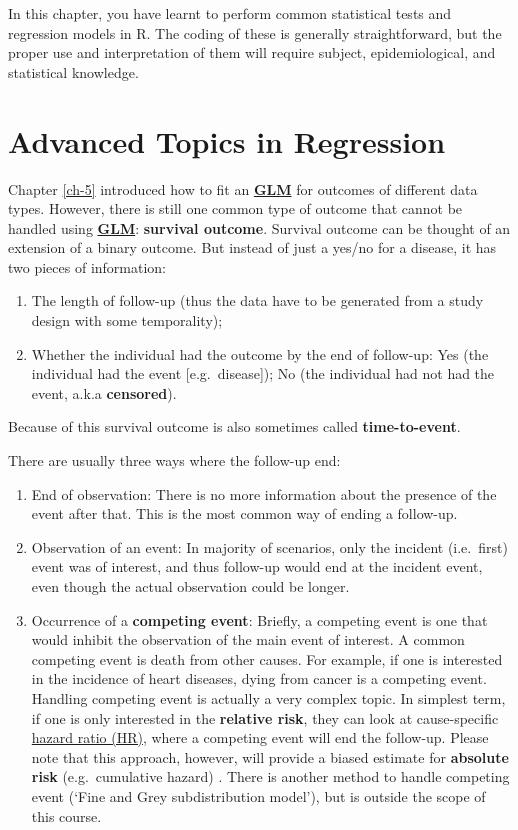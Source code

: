 \documentclass[
]{book}
\providecommand{\tightlist}{%
  \setlength{\itemsep}{0pt}\setlength{\parskip}{0pt}}
\begin{document}
In this chapter, you have learnt to perform common statistical tests and regression models in R. The coding of these is generally straightforward, but the proper use and interpretation of them will require subject, epidemiological, and statistical knowledge.

\chapter{Advanced Topics in Regression}\label{ch-6}

Chapter \ref{ch-5} introduced how to fit an \textbf{\hyperref[acronyms_GLM]{GLM}} for outcomes of different data types. However, there is still one common type of outcome that cannot be handled using \textbf{\hyperref[acronyms_GLM]{GLM}}: \textbf{survival outcome}. Survival outcome can be thought of an extension of a binary outcome. But instead of just a yes/no for a disease, it has two pieces of information:

\begin{enumerate}
\def\labelenumi{\arabic{enumi}.}
\tightlist
\item
  The length of follow-up (thus the data have to be generated from a study design with some temporality);
\item
  Whether the individual had the outcome by the end of follow-up: Yes (the individual had the event {[}e.g.~disease{]}); No (the individual had not had the event, a.k.a \textbf{censored}).
\end{enumerate}

Because of this survival outcome is also sometimes called \textbf{time-to-event}.

There are usually three ways where the follow-up end:

\begin{enumerate}
\def\labelenumi{\arabic{enumi}.}
\tightlist
\item
  End of observation: There is no more information about the presence of the event after that. This is the most common way of ending a follow-up.
\item
  Observation of an event: In majority of scenarios, only the incident (i.e.~first) event was of interest, and thus follow-up would end at the incident event, even though the actual observation could be longer.
\item
  Occurrence of a \textbf{competing event}: Briefly, a competing event is one that would inhibit the observation of the main event of interest. A common competing event is death from other causes. For example, if one is interested in the incidence of heart diseases, dying from cancer is a competing event. Handling competing event is actually a very complex topic. In simplest term, if one is only interested in the \textbf{relative risk}, they can look at cause-specific \hyperref[acronyms_HR]{hazard ratio (HR)}, where a competing event will end the follow-up. Please note that this approach, however, will provide a biased estimate for \textbf{absolute risk} (e.g.~cumulative hazard) \citep{lau2009competing}. There is another method to handle competing event (`Fine and Grey subdistribution model'), but is outside the scope of this course.
\end{enumerate}
\end{document}
